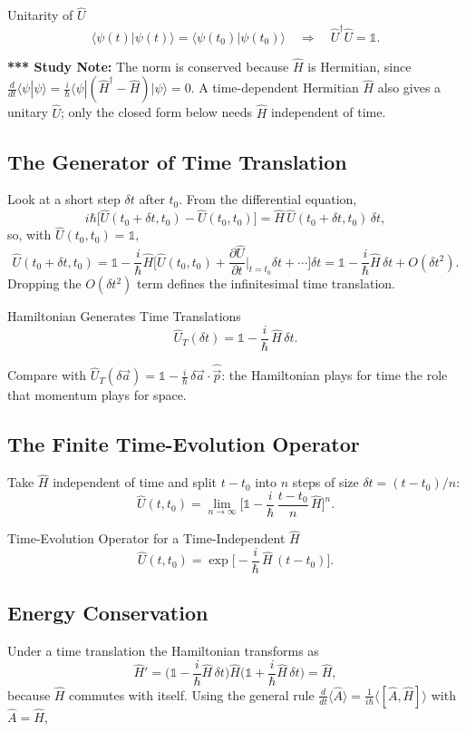 \documentclass[11pt,a4paper]{article}
\begin{document}
\begin{thm}{Unitarity of $\hat U$}
\[
\langle\psi(t)|\psi(t)\rangle=\langle\psi(t_0)|\psi(t_0)\rangle\quad\Longrightarrow\quad \hat U^\dagger\hat U=\mathbb 1 .
\]
\end{thm}

\textbf{*** Study Note:} The norm is conserved because $\hat H$ is Hermitian, since $\frac{d}{dt}\langle\psi|\psi\rangle=\frac{i}{\hbar}\langle\psi|(\hat H^\dagger-\hat H)|\psi\rangle=0$. A time-dependent Hermitian $\hat H$ also gives a unitary $\hat U$; only the closed form below needs $\hat H$ independent of time.

\subsection{The Generator of Time Translation}
Look at a short step $\delta t$ after $t_0$. From the differential equation,
\[
i\hbar\big[\hat U(t_0+\delta t,t_0)-\hat U(t_0,t_0)\big]=\hat H\,\hat U(t_0+\delta t,t_0)\,\delta t ,
\]
so, with $\hat U(t_0,t_0)=\mathbb 1$,
\[
\hat U(t_0+\delta t,t_0)=\mathbb 1-\frac i\hbar\hat H\Big[\hat U(t_0,t_0)+\frac{\partial\hat U}{\partial t}\Big|_{t=t_0}\delta t+\cdots\Big]\delta t=\mathbb 1-\frac i\hbar\hat H\,\delta t+O(\delta t^2).
\]
Dropping the $O(\delta t^2)$ term defines the infinitesimal time translation.

\begin{thm}{Hamiltonian Generates Time Translations}
\[
\hat U_T(\delta t)=\mathbb 1-\frac i\hbar\,\hat H\,\delta t .
\]
\end{thm}

Compare with $\hat U_T(\delta\vec a)=\mathbb 1-\tfrac i\hbar\,\delta\vec a\cdot\hat{\vec p}$: the Hamiltonian plays for time the role that momentum plays for space.

\subsection{The Finite Time-Evolution Operator}
Take $\hat H$ independent of time and split $t-t_0$ into $n$ steps of size $\delta t=(t-t_0)/n$:
\[
\hat U(t,t_0)=\lim_{n\to\infty}\Big[\mathbb 1-\frac i\hbar\,\frac{t-t_0}{n}\,\hat H\Big]^n .
\]

\begin{thm}{Time-Evolution Operator for a Time-Independent $\hat H$}
\[
\hat U(t,t_0)=\exp\!\Big[-\frac i\hbar\,\hat H\,(t-t_0)\Big].
\]
\end{thm}

\subsection{Energy Conservation}
Under a time translation the Hamiltonian transforms as
\[
\hat H'=\Big(\mathbb 1-\frac i\hbar\hat H\,\delta t\Big)\hat H\Big(\mathbb 1+\frac i\hbar\hat H\,\delta t\Big)=\hat H ,
\]
because $\hat H$ commutes with itself. Using the general rule $\frac{d}{dt}\langle\hat A\rangle=\frac1{i\hbar}\langle[\hat A,\hat H]\rangle$ with $\hat A=\hat H$,
\end{document}
